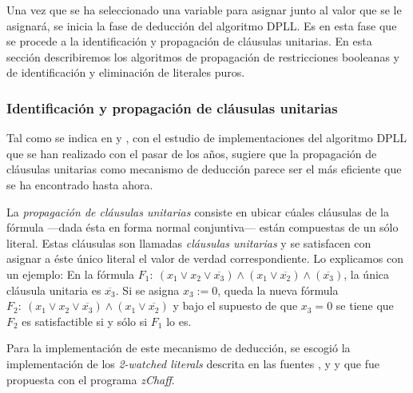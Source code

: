 \documentclass[12pt,lettersize,oneside]{article}
\begin{document}
Una vez que se ha seleccionado una variable para asignar junto al valor que se
le asignará, se inicia la fase de deducción del algoritmo DPLL. Es en esta fase
que se procede a la identificación y propagación de cláusulas unitarias. En esta
sección describiremos los algoritmos de propagación de restricciones booleanas y
de identificación y eliminación de literales puros.


\subsubsection{Identificación y propagación de cláusulas
  unitarias}\label{UnitPropagation}
Tal como se indica en \cite{Zhang} y \cite{ZhangThesis}, con el estudio de
implementaciones del algoritmo DPLL que se han realizado con el pasar de los
años, sugiere que la propagación de cláusulas unitarias como mecanismo de
deducción parece ser el más eficiente que se ha encontrado hasta ahora.

La \emph{propagación de cláusulas unitarias} consiste en ubicar cúales cláusulas
de la fórmula ---dada ésta en forma normal conjuntiva--- están compuestas de un
sólo literal. Estas cláusulas son llamadas \emph{cláusulas unitarias} y se
satisfacen con asignar a éste único literal el valor de verdad correspondiente.
Lo explicamos con un ejemplo: En la fórmula $F_1:\ (x_1 \vee x_2 \vee
\overline{x_3}) \wedge (x_1 \vee \overline{x_2}) \wedge (\overline{x_3})$, la
única cláusula unitaria es $\overline{x_3}$. Si se asigna $x_3:=0$, queda la
nueva fórmula $F_2:\ (x_1 \vee x_2 \vee \overline{x_3}) \wedge (x_1 \vee
\overline{x_2}) $ y bajo el supuesto de que $x_3=0$ se tiene que $F_2$ es
satisfactible si y sólo si $F_1$ lo es.


Para la implementación de este mecanismo de deducción, se escogió la
implementación de los \emph{2-watched literals} descrita en las fuentes
\cite{Marques}, \cite{Zhang} y \cite{ZhangThesis} y que fue propuesta con el
programa \emph{zChaff}.

\end{document}
